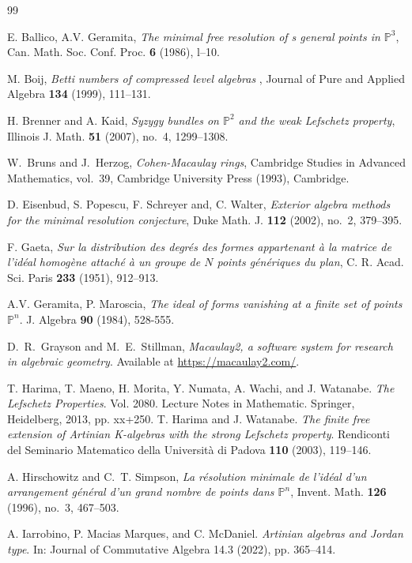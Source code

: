 \documentclass[12pt,twoside]{amsart}
\numberwithin{equation}{section} \hyphenation{semi-stable}
\newcommand {\PP}{\mathbb{P}}
\theoremstyle{definition}
\begin{document}
\begin{thebibliography}{99}

  E. Ballico, A.V. Geramita, {\em The minimal free resolution of s general points in $\PP^3$}, Can. Math. Soc.
Conf. Proc. {\bf 6} (1986), l--10.

 M. Boij, {\em Betti numbers of compressed level algebras },     Journal of Pure and Applied Algebra {\bf 134} (1999), 111--131.               

H. Brenner and A. Kaid, {\em Syzygy bundles on $\mathbb{P}^2$ and the weak Lefschetz property}, Illinois J. Math. {\bf 51} (2007), no.~4, 1299--1308.

W.~Bruns and J.~Herzog, \emph{Cohen-{M}acaulay rings}, Cambridge Studies in Advanced Mathematics, vol.~39, Cambridge University Press (1993), Cambridge.


 D. Eisenbud, S. Popescu, F. Schreyer and, C. Walter, {\em Exterior algebra methods for the minimal resolution conjecture}, Duke Math. J. {\bf 112} (2002), no.~2, 379--395.

 F. Gaeta, {\em Sur la distribution des degr\'es des formes appartenant \`a{} la matrice de l'id\'eal homog\`ene attach\'e{} \`a{} un groupe de $N$ points g\'en\'eriques du plan}, C. R. Acad. Sci. Paris {\bf 233} (1951), 912--913.


 A.V. Geramita, P. Maroscia, {\em The ideal of forms vanishing at a finite set of points $\PP^n$}. J. Algebra
{\bf 90} (1984), 528-555.

D.~R.~Grayson and M.~E.~Stillman,
\emph{Macaulay2, a software system for research in algebraic geometry}.
Available at \url{https://macaulay2.com/}.

 T. Harima, T. Maeno, H. Morita, Y. Numata, A. Wachi, and J. Watanabe.
{\em The Lefschetz Properties}. Vol. 2080. Lecture Notes in Mathematic. Springer,
Heidelberg, 2013, pp. xx+250.
 T. Harima and J. Watanabe. {\em The finite free extension of Artinian K-algebras
with the strong Lefschetz property}.  Rendiconti del Seminario Matematico
della Università di Padova {\bf 110} (2003),  119--146.

 A. Hirschowitz and C.~T. Simpson, {\em La r\'esolution minimale de l'id\'eal d'un arrangement g\'en\'eral d'un grand nombre de points dans $\PP^n$}, Invent. Math. {\bf 126} (1996), no.~3, 467--503.

 A. Iarrobino, P. Macias Marques, and C. McDaniel. {\em Artinian algebras and
Jordan type}. In: Journal of Commutative Algebra 14.3 (2022), pp. 365--414.


\end{thebibliography}
\end{document}
